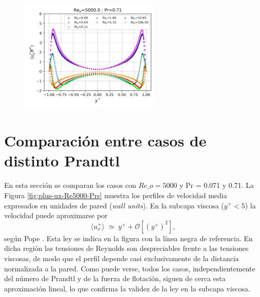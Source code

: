 \begin{figure}[H]
  \centering
   \includegraphics[width=0.6\textwidth]{figures/cap5/Re5000-Pr071/uphif_profile.png}
   	\label{fig:uphif-Re5000-Pr071}
  \caption{}
\end{figure}


\section{Comparación entre casos de distinto Prandtl}


En esta sección se comparan los casos con $Re\_o = 5000$ y Pr = 0.071 y 0.71. La Figura \ref{fig:plus-ux-Re5000-Prs} muestra los perfiles de velocidad media expresados en unidades de pared (\textit{wall units}). En la subcapa viscosa ($y^+ < 5$) la velocidad puede aproximarse por
$$\langle u_x^+ \rangle \;\simeq\; y^+ + \mathcal{O} \left[(y^+)^{2} \right],$$
según Pope \cite{pope2001turbulent}. Esta ley se indica en la figura con la línea negra de referencia. En dicha región las tensiones de Reynolds son despreciables frente a las tensiones viscosas, de modo que el perfil depende casi exclusivamente de la distancia normalizada a la pared. Como puede verse, todos los casos, independientemente del número de Prandtl y de la fuerza de flotación, siguen de cerca esta aproximación lineal, lo que confirma la validez de la ley en la subcapa viscosa.

